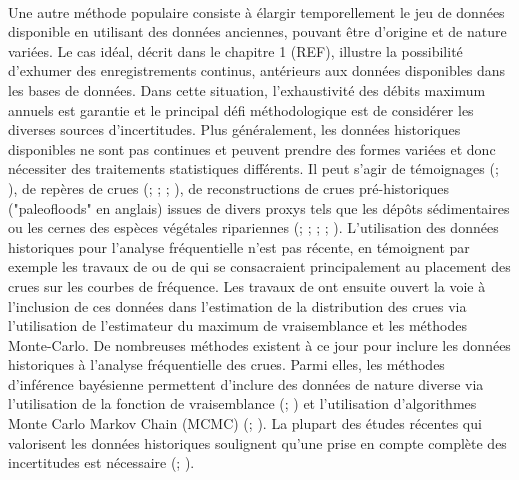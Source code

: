 	\paragraph{} Une autre méthode populaire consiste à élargir temporellement le jeu de données disponible en utilisant des données anciennes, pouvant être d'origine et de nature variées. Le cas idéal, décrit dans le chapitre 1 (REF), illustre la possibilité d'exhumer des enregistrements continus, antérieurs aux données disponibles dans les bases de données. Dans cette situation, l'exhaustivité des débits maximum annuels est garantie et le principal défi méthodologique est de considérer les diverses sources d'incertitudes. Plus généralement, les données historiques disponibles ne sont pas continues et peuvent prendre des formes variées et donc nécessiter des traitements statistiques différents. Il peut s'agir de témoignages (\citet{pichard_les_1995}; \citet{kjeldsen_documentary_2014}), de repères de crues (\citet{parkes_defining_2016}; \citet{piotte_collection_2016}; \citet{engeland_new_2020}; \citet{medd_reperes_2023}), de reconstructions de crues pré-historiques ("paleofloods" en anglais) issues de divers proxys tels que les dépôts sédimentaires ou les cernes des espèces végétales ripariennes (\citet{stedinger_flood_1986}; \citet{benito_use_2004}; \citet{dezileau_multidating_2014}; \citet{st_george_paleofloods_2020}; \citet{engeland_new_2020}). L'utilisation des données historiques pour l'analyse fréquentielle n'est pas récente, en témoignent par exemple les travaux de \citet{benson_use_1950} ou de \citet{hirsch_plotting_1987} qui se consacraient principalement au placement des crues sur les courbes de fréquence. Les travaux de \citet{stedinger_flood_1986} ont ensuite ouvert la voie à l'inclusion de ces données dans l'estimation de la distribution des crues via l'utilisation de l'estimateur du maximum de vraisemblance et les méthodes Monte-Carlo. De nombreuses méthodes existent à ce jour pour inclure les données historiques à l'analyse fréquentielle des crues. Parmi elles, les méthodes d'inférence bayésienne permettent d'inclure des données de nature diverse via l'utilisation de la fonction de vraisemblance (\citet{stedinger_flood_1986}; \citet{kuczera_comprehensive_1999}) et l'utilisation d'algorithmes Monte Carlo Markov Chain (MCMC) (\citet{reis_bayesian_2005}; \citet{renard_application_2006}). La plupart des études récentes qui valorisent les données historiques soulignent qu'une prise en compte complète des incertitudes est nécessaire (\citet{neppel_flood_2010}; \citet{parkes_defining_2016}).
	
